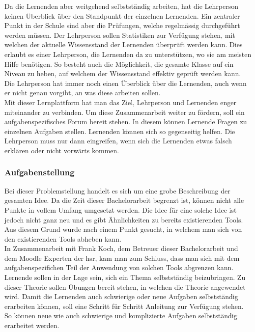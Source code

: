 Da die Lernenden aber weitgehend selbstständig arbeiten, hat die Lehrperson keinen Überblick über den Standpunkt der einzelnen Lernenden. Ein zentraler Punkt in der Schule sind aber die Prüfungen, welche regelmässig durchgeführt werden müssen. Der Lehrperson sollen Statistiken zur Verfügung stehen, mit welchen der aktuelle Wissensstand der Lernenden überprüft werden kann. Dies erlaubt es einer Lehrperson, die Lernenden da zu unterstützen, wo sie am meisten Hilfe benötigen. So besteht auch die Möglichkeit, die gesamte Klasse auf ein Niveau zu heben, auf welchem der Wissensstand effektiv geprüft werden kann. Die Lehrperson hat immer noch einen Überblick über die Lernenden, auch wenn er nicht genau vorgibt, an was diese arbeiten sollen. \\

Mit dieser Lernplattform hat man das Ziel, Lehrperson und Lernenden enger miteinander zu verbinden. Um diese Zusammenarbeit weiter zu fördern, soll ein aufgabenspezifisches Forum bereit stehen. In diesem können Lernende Fragen zu einzelnen Aufgaben stellen. Lernenden können sich so gegenseitig helfen. Die Lehrperson muss nur dann eingreifen, wenn sich die Lernenden etwas falsch erklären oder nicht vorwärts kommen.

\subsubsection{Aufgabenstellung}
Bei dieser Problemstellung handelt es sich um eine grobe Beschreibung der gesamten Idee. Da die Zeit dieser Bachelorarbeit begrenzt ist, können nicht alle Punkte in vollem Umfang umgesetzt werden. Die Idee für eine solche Idee ist jedoch nicht ganz neu und es gibt Ähnlichkeiten zu bereits existierenden Tools. Aus diesem Grund wurde nach einem Punkt gesucht, in welchem man sich von den existierenden Tools abheben kann. \\

In Zusammenarbeit mit Frank Koch, dem Betreuer dieser Bachelorarbeit und dem Moodle Experten der \gls{hsr}, kam man zum Schluss, dass man sich mit dem aufgabenspezifichen Teil der Anwendung von solchen Tools abgrenzen kann. Lernende sollen in der Lage sein, sich ein Thema selbstständig beizubringen. Zu dieser Theorie sollen Übungen bereit stehen, in welchen die Theorie angewendet wird. Damit die Lernenden auch schwierige oder neue Aufgaben selbstständig erarbeiten können, soll eine Schritt für Schritt Anleitung zur Verfügung stehen. So können neue wie auch schwierige und komplizierte Aufgaben selbstständig erarbeitet werden.

